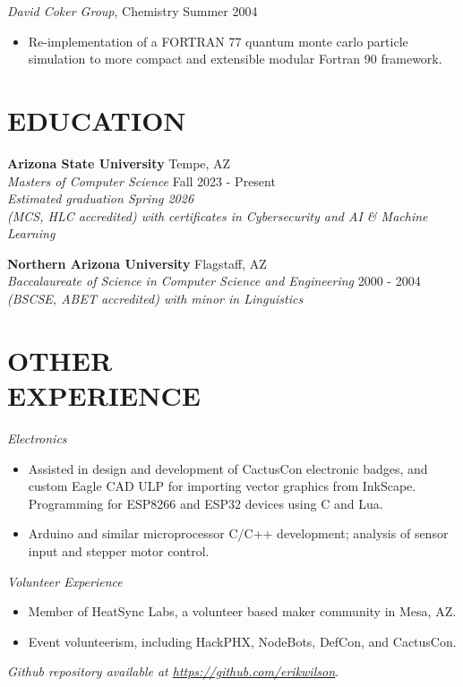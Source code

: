 \documentclass[line,margin]{res}
\begin{document}
\begin{resume}
          {\sl David Coker Group}, Chemistry \hfill Summer 2004
          \begin{itemize} \itemsep -2pt
          \item
            Re-implementation of a FORTRAN 77 quantum monte carlo particle simulation to more compact and extensible modular Fortran 90 framework.
          \end{itemize}

  \section{EDUCATION}
          {\bf Arizona State University} \hfill Tempe, AZ\\
          {\sl Masters of Computer Science} \hfill Fall 2023 - Present\\
          {\sl Estimated graduation Spring 2026}\\
          {\sl (MCS, HLC accredited) with certificates in Cybersecurity and AI \& Machine Learning}

          {\bf Northern Arizona University} \hfill Flagstaff, AZ\\
          {\sl Baccalaureate of Science in Computer Science and Engineering} \hfill 2000 - 2004\\
          {\sl (BSCSE, ABET accredited) with minor in Linguistics}

  \section{OTHER\\EXPERIENCE}
          \emph{Electronics}
          \begin{itemize} \itemsep -2pt
          \item
            Assisted in design and development of CactusCon electronic badges, and custom Eagle CAD ULP for importing
            vector graphics from InkScape. Programming for ESP8266 and ESP32 devices using C and Lua.
          \item
            Arduino and similar microprocessor C/C++ development; analysis of sensor input and stepper motor control.
          \end{itemize}

          \emph{Volunteer Experience}
          \begin{itemize} \itemsep -2pt %
          \item
            Member of HeatSync Labs, a volunteer based maker community in Mesa, AZ.
          \item
            Event volunteerism, including HackPHX, NodeBots, DefCon, and CactusCon.
          \end{itemize}

          \emph{Github repository available at \href{https://github.com/erikwilson}{https://github.com/erikwilson}.}

\end{resume}
\end{document}
